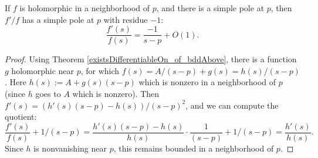 \begin{theorem}[logDerivResidue]
\label{logDerivResidue}
\leanok
If $f$ is holomorphic in a neighborhood of $p$, and there is a simple pole at $p$, then $f'/
  f$ has a simple pole at $p$ with residue $-1$:
  $$ \frac{f'(s)}{f(s)} = \frac{-1}{s - p} + O(1).$$
\end{theorem}
\begin{proof}
\leanok
Using Theorem \ref{existsDifferentiableOn_of_bddAbove}, there is a function $g$ holomorphic
  near $p$, for which $f(s) = A/(s-p) + g(s) = h(s)/ (s-p)$. Here $h(s):= A + g(s)(s-p)$ which
  is nonzero in a neighborhood of $p$ (since $h$ goes to $A$ which is nonzero).
  Then $f'(s) = (h'(s)(s-p) - h(s))/(s-p)^2$, and we can compute the quotient:
  $$
  \frac{f'(s)}{f(s)}+1/(s-p) = \frac{h'(s)(s-p) - h(s)}{h(s)} \cdot \frac{1}{(s-p)}+1/(s-p)
  =
  \frac{h'(s)}{h(s)}.
  $$
  Since $h$ is nonvanishing near $p$, this remains bounded in a neighborhood of $p$.
\end{proof}
